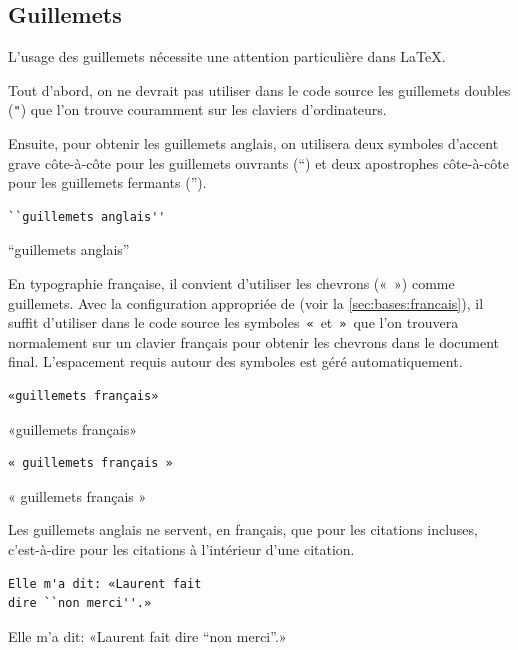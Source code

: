 \subsection{Guillemets}
\label{chap:bases:caracteres:guillemets}

L'usage des guillemets nécessite une attention particulière dans {\LaTeX}.

Tout d'abord, on ne devrait pas utiliser dans le code source les
guillemets doubles (\verb="=) que l'on trouve couramment sur les
claviers d'ordinateurs.

Ensuite, pour obtenir les guillemets anglais, on utilisera deux
symboles d'accent grave côte-à-côte pour les guillemets ouvrants (``)
et deux apostrophes côte-à-côte pour les guillemets fermants ('').
\begin{demo}
  \begin{texample}
\begin{lstlisting}[escapeinside={}]
``guillemets anglais''
\end{lstlisting}
    \producing
    ``guillemets anglais''
  \end{texample}
\end{demo}

En typographie française, il convient d'utiliser les chevrons («\ »)
comme guillemets. Avec la configuration appropriée de 
(voir la \autoref{sec:bases:francais}), il suffit d'utiliser dans le
code source les symboles \,\verb=«=\, et \,\verb=»=\, que l'on
trouvera normalement sur un clavier français pour obtenir les chevrons
dans le document final. L'espacement requis autour des symboles est
géré automatiquement.
\begin{demo}
  \begin{texample}
\begin{lstlisting}
«guillemets français»
\end{lstlisting}
    \producing
    «guillemets français»
  \end{texample}
  \begin{texample}
\begin{lstlisting}
« guillemets français »
\end{lstlisting}
    \producing
    « guillemets français »
  \end{texample}
\end{demo}
Les guillemets anglais ne servent, en français, que pour les citations
incluses, c'est-à-dire pour les citations à l'intérieur d'une
citation.
\begin{demo}
  \begin{texample}
\begin{lstlisting}[escapeinside={}]
Elle m'a dit: «Laurent fait
dire ``non merci''.»
\end{lstlisting}
    \producing
    Elle m'a dit: «Laurent fait
    dire ``non merci''.»
  \end{texample}
\end{demo}

